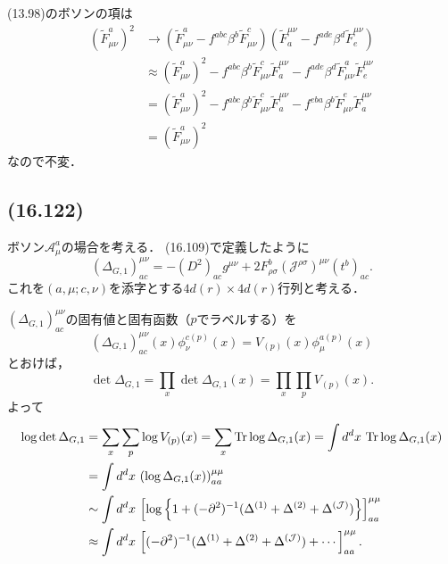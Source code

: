(13.98)のボソンの項は
\begin{align*}
  (\tilde{F}_{\mu\nu}^a)^2 &\to
  (\tilde{F}_{\mu\nu}^a - f^{abc} \beta^b \tilde{F}_{\mu\nu}^c)
  (\tilde{F}^{\mu\nu}_a - f^{ade} \beta^d \tilde{F}^{\mu\nu}_e) \\
  &\approx (\tilde{F}_{\mu\nu}^a)^2 - f^{abc} \beta^b \tilde{F}_{\mu\nu}^c\tilde{F}^{\mu\nu}_a
  - f^{ade} \beta^d \tilde{F}_{\mu\nu}^a \tilde{F}^{\mu\nu}_e \\
  &= (\tilde{F}_{\mu\nu}^a)^2 - f^{abc} \beta^b \tilde{F}_{\mu\nu}^c\tilde{F}^{\mu\nu}_a
  - f^{eba} \beta^b \tilde{F}_{\mu\nu}^e \tilde{F}^{\mu\nu}_a \\
  &= (\tilde{F}_{\mu\nu}^a)^2
\end{align*}
なので不変．

\subsection{(16.122)}
ボソン$\mathcal{A}^a_\mu$の場合を考える．
(16.109)で定義したように
\[ (\Delta_{G,1})_{ac}^{\mu\nu} = -(D^2)_{ac} g^{\mu\nu} + 2 F^b_{\rho\sigma} (\mathcal{J}^{\rho\sigma})^{\mu\nu} (t^b)_{ac} . \]
これを$(a,\mu; c,\nu)$を添字とする$4d(r) \times 4d(r)$行列と考える．

$(\Delta_{G,1})_{ac}^{\mu\nu}$の固有値と固有函数（$p$でラベルする）を
\[ (\Delta_{G,1})_{ac}^{\mu\nu}(x) \phi^{c(p)}_\nu(x) = V_{(p)}(x) \phi^{a(p)}_\mu(x) \]
とおけば，
\[ \det\Delta_{G,1} = \prod_x \det\Delta_{G,1}(x) = \prod_x \prod_p V_{(p)}(x) . \]
よって
\begin{align*}
  \log\det\Delta_{G,1} &= \sum_{x} \sum_{p} \log V_{(p)}(x)
  = \sum_{x} \operatorname{Tr} \log\Delta_{G,1}(x)
  = \int d^dx \, \operatorname{Tr} \log\Delta_{G,1}(x) \\
  & = \int d^dx \, \left( \log\Delta_{G,1}(x) \right)_{aa}^{\mu\mu} \\
  &\sim \int d^dx \, \left[ \log \left\{ 1 + (-\partial^2)^{-1} (\Delta^{(1)}+\Delta^{(2)}+\Delta^{(\mathcal{J})}) \right\} \right]_{aa}^{\mu\mu} \\
  &\approx \int d^dx \, \left[ (-\partial^2)^{-1} (\Delta^{(1)}+\Delta^{(2)}+\Delta^{(\mathcal{J})}) + \cdots \right]_{aa}^{\mu\mu} .
\end{align*}

